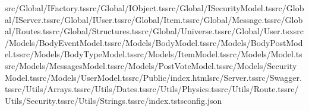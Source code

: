 \documentclass[a4paper,12pt]{article}
\begin{document}
src/Global/IFactory.ts\newline src/Global/IObject.ts\newline src/Global/ISecurityModel.ts\newline src/Global/IServer.ts\newline src/Global/IUser.ts\newline src/Global/Item.ts\newline src/Global/Message.ts\newline src/Global/Routes.ts\newline src/Global/Structures.ts\newline src/Global/Universe.ts\newline src/Global/User.tsx\newline src/Models/BodyEventModel.ts\newline src/Models/BodyModel.ts\newline src/Models/BodyPostModel.ts\newline src/Models/BodyTypeModel.ts\newline src/Models/ItemModel.ts\newline src/Models/Model.ts\newline src/Models/MessagesModel.ts\newline src/Models/PostVoteModel.ts\newline src/Models/SecurityModel.ts\newline src/Models/UserModel.ts\newline src/Public/index.html\newline src/Server.ts\newline src/Swagger.ts\newline src/Utils/Arrays.ts\newline src/Utils/Dates.ts\newline src/Utils/Physics.ts\newline src/Utils/Route.ts\newline src/Utils/Security.ts\newline src/Utils/Strings.ts\newline src/index.ts\newline tsconfig.json\newline


\end{document}

